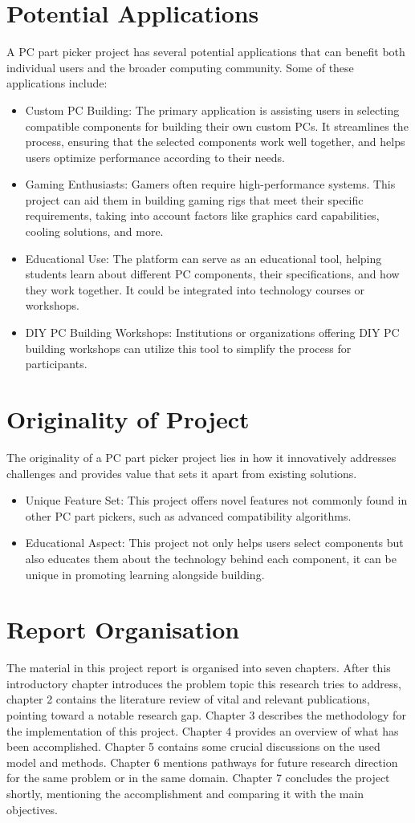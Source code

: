 \section{Potential Applications}
 A PC part picker project has several potential applications that can benefit both individual users and the broader computing community. Some of these applications include:
\begin{itemize}
    \item Custom PC Building: The primary application is assisting users in selecting compatible components for building their own custom PCs. It streamlines the process, ensuring that the selected components work well together, and helps users optimize performance according to their needs. 
    \item Gaming Enthusiasts: Gamers often require high-performance systems. This project can aid them in building gaming rigs that meet their specific requirements, taking into account factors like graphics card capabilities, cooling solutions, and more.
    \item Educational Use: The platform can serve as an educational tool, helping students learn about different PC components, their specifications, and how they work together. It could be integrated into technology courses or workshops.
    \item DIY PC Building Workshops: Institutions or organizations offering DIY PC building workshops can utilize this tool to simplify the process for participants.
\end{itemize}
\section{Originality of Project}
The originality of a PC part picker project lies in how it innovatively addresses challenges and provides value that sets it apart from existing solutions.
\begin{itemize}
    \item Unique Feature Set: This project offers novel features not commonly found in other PC part pickers, such as advanced compatibility algorithms.
    \item Educational Aspect: This project not only helps users select components but also educates them about the technology behind each component, it can be unique in promoting learning alongside building.
\end{itemize}
\section{Report Organisation}
The material in this project report is organised into seven chapters. After this introductory chapter introduces the problem topic this research tries to address, chapter 2 contains the literature review of vital and relevant publications, pointing toward a notable research gap. Chapter 3 describes the methodology for the implementation of this project. Chapter 4 provides an overview of what has been accomplished. Chapter 5 contains some crucial discussions on the used model and methods. Chapter 6 mentions pathways for future research direction for the same problem or in the same domain. Chapter 7 concludes the project shortly, mentioning the accomplishment and comparing it with the main objectives.